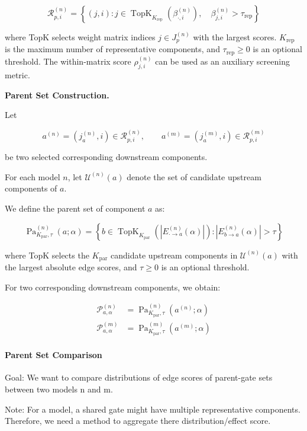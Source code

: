 \documentclass[11pt,a4paper]{article}
\begin{document}
$$
\mathcal{R}_{p,i}^{(n)}
=
\left\{
(j,i):
j\in\operatorname{TopK}_{K_{\mathrm{rep}}}
\left(\beta_{\cdot,i}^{(n)}\right),
\quad
\beta_{j,i}^{(n)}>\tau_{\mathrm{rep}}
\right\}
$$

where TopK selects weight matrix indices
$j\in J_p^{(n)}$ with the largest scores.
$K_{\mathrm{rep}}$ is the maximum number of
representative components, and
$\tau_{\mathrm{rep}}\geq0$ is an optional threshold.
The within-matrix score $\rho_{j,i}^{(n)}$
can be used as an auxiliary screening metric.

\textbf{Parent Set Construction.}

Let

$$
a^{(n)}=(j_a^{(n)},i)\in\mathcal{R}_{p,i}^{(n)},
\qquad
a^{(m)}=(j_a^{(m)},i)\in\mathcal{R}_{p,i}^{(m)}
$$

be two selected corresponding downstream
components.

For each model $n$, let $\mathcal{U}^{(n)}(a)$
denote the set of candidate upstream components of $a$.

We define the parent set of component $a$ as:

$$
\operatorname{Pa}_{K_{\mathrm{par}},\tau}^{(n)}(a;\alpha)
=
\left\{
b\in\operatorname{TopK}_{K_{\mathrm{par}}}
\left(|E_{\cdot\rightarrow a}^{(n)}(\alpha)|\right)
:
|E_{b\rightarrow a}^{(n)}(\alpha)|>\tau
\right\}
$$

where TopK selects the $K_{\mathrm{par}}$
candidate upstream components in
$\mathcal{U}^{(n)}(a)$ with the largest
absolute edge scores, and $\tau\geq0$
is an optional threshold.

For two corresponding downstream components,
we obtain:

$$
\begin{aligned}
\mathcal{P}_{a,\alpha}^{(n)}
&=
\operatorname{Pa}_{K_{\mathrm{par}},\tau}^{(n)}
(a^{(n)};\alpha)
\\[8pt]
\mathcal{P}_{a,\alpha}^{(m)}
&=
\operatorname{Pa}_{K_{\mathrm{par}},\tau}^{(m)}
(a^{(m)};\alpha)
\end{aligned}
$$

\paragraph{Parent Set Comparison}

Goal: We want to compare distributions of edge scores of parent-gate sets between two models n and m.

Note: For a model, a shared gate might have multiple representative components. Therefore, we need a method to aggregate there distribution/effect score.
\end{document}
